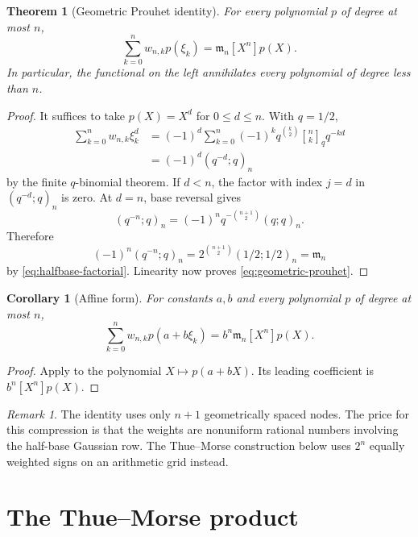 \documentclass[11pt,oneside,openany]{book}
\newtheorem{theorem}{Theorem}[chapter]
\newtheorem{corollary}[corollary]{Corollary}
\theoremstyle{definition}
\theoremstyle{remark}
\newtheorem{remark}[remark]{Remark}
\newcommand{\Qbinom}[3]{\genfrac{[}{]}{0pt}{}{#1}{#2}_{#3}}
\begin{document}
\begin{theorem}[Geometric Prouhet identity]\label{thm:geometric-prouhet}
For every polynomial $p$ of degree at most $n$,
\begin{equation}\label{eq:geometric-prouhet}
 \sum_{k=0}^{n}w_{n,k}p(\xi_k)
 =\mathfrak m_n[X^n]p(X).
\end{equation}
In particular, the functional on the left annihilates every polynomial of degree less than $n$.
\end{theorem}

\begin{proof}
It suffices to take $p(X)=X^d$ for $0\le d\le n$.  With $q=1/2$,
\begin{align*}
 \sum_{k=0}^{n}w_{n,k}\xi_k^d
 &=(-1)^d\sum_{k=0}^{n}(-1)^kq^{\binom k2}
   \Qbinom nkq q^{-kd}\\
 &=(-1)^d(q^{-d};q)_n
\end{align*}
by the finite $q$-binomial theorem.  If $d<n$, the factor with index $j=d$ in
$(q^{-d};q)_n$ is zero.  At $d=n$, base reversal gives
\[
 (q^{-n};q)_n=(-1)^nq^{-\binom{n+1}{2}}(q;q)_n.
\]
Therefore
\[
 (-1)^n(q^{-n};q)_n
 =2^{\binom{n+1}{2}}(1/2;1/2)_n
 =\mathfrak m_n
\]
by \eqref{eq:halfbase-factorial}.  Linearity now proves \eqref{eq:geometric-prouhet}.
\end{proof}

\begin{corollary}[Affine form]\label{cor:geometric-prouhet-affine}
For constants $a,b$ and every polynomial $p$ of degree at most $n$,
\[
 \sum_{k=0}^{n}w_{n,k}p(a+b\xi_k)
 =b^n\mathfrak m_n[X^n]p(X).
\]
\end{corollary}

\begin{proof}
Apply  to the polynomial $X\mapsto p(a+bX)$.  Its leading coefficient is $b^n[X^n]p(X)$.
\end{proof}

\begin{remark}
The identity uses only $n+1$ geometrically spaced nodes.  The price for this compression is that the weights are nonuniform rational numbers involving the half-base Gaussian row.  The Thue--Morse construction below uses $2^n$ equally weighted signs on an arithmetic grid instead.
\end{remark}

\section{The Thue--Morse product}
\end{document}
